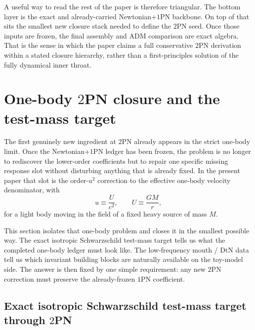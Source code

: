 \documentclass[11pt]{article}
\newcommand{\OnePN}{\mathrm{1PN}}
\newcommand{\TwoPN}{\mathrm{2PN}}
\newcommand{\ADM}{\mathrm{ADM}}
\newcommand{\DtN}{\mathrm{DtN}}
\begin{document}
A useful way to read the rest of the paper is therefore triangular. The bottom layer is
the exact and already-carried Newtonian+\(\OnePN\) backbone. On top of that sits the
smallest new closure stack needed to define the \(\TwoPN\) seed. Once those inputs are
frozen, the final assembly and \(\ADM\) comparison are exact algebra. That is the sense
in which the paper claims a full conservative \(\TwoPN\) derivation within a stated
closure hierarchy, rather than a first-principles solution of the fully dynamical inner
throat.

\section{One-body \texorpdfstring{$2$}{2}PN closure and the test-mass target}
\label{sec:one-body}

The first genuinely new ingredient at \(\TwoPN\) already appears in the strict
one-body limit.  Once the Newtonian+\(\OnePN\) ledger has been frozen, the problem is
no longer to rediscover the lower-order coefficients but to repair one specific missing
response slot without disturbing anything that is already fixed.  In the present paper
that slot is the order-\(u^2\) correction to the effective one-body velocity denominator,
with
\[
u\equiv \frac{U}{c^2},
\qquad
U\equiv \frac{GM}{r},
\]
for a light body moving in the field of a fixed heavy source of mass \(M\).

This section isolates that one-body problem and closes it in the smallest possible way.
The exact isotropic Schwarzschild test-mass target tells us what the completed one-body
ledger must look like.  The low-frequency mouth / \(\DtN\) data tell us which invariant
building blocks are naturally available on the toy-model side.  The answer is then fixed
by one simple requirement: any new \(\TwoPN\) correction must preserve the already-frozen
\(\OnePN\) coefficient.

\subsection{Exact isotropic Schwarzschild test-mass target through \texorpdfstring{$2$}{2}PN}
\label{sec:one-body-target}
\end{document}
